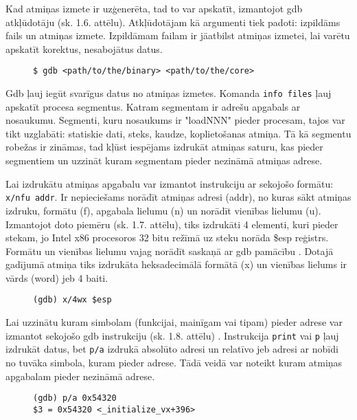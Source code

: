 Kad atmiņas izmete ir uzģenerēta, tad to var apskatīt, izmantojot gdb atkļūdotāju (sk. 1.6. attēlu). 
Atkļūdotājam kā argumenti tiek padoti: izpildāms fails un atmiņas izmete. 
Izpildāmam failam ir jāatbilst atmiņas izmetei, lai varētu apskatīt korektus, nesabojātus datus.

\begin{figure}[h]
\begin{lstlisting}[style=customgdb]
$ gdb <path/to/the/binary> <path/to/the/core>
\end{lstlisting}
\caption{\textbf{\fontsize{11}{12}\selectfont {Atmiņas izmetes atvēršana, izmantojot gdb atkļūdotāju}}}
\end{figure}

Gdb ļauj iegūt svarīgus datus no atmiņas izmetes. Komanda \texttt{info files} ļauj apskatīt procesa segmentus. 
Katram segmentam ir adrešu apgabals ar nosaukumu. 
Segmenti, kuru nosaukums ir "loadNNN" pieder procesam, tajos var tikt uzglabāti: statiskie dati, steks, kaudze, koplietošanas atmiņa.
Tā kā segmentu robežas ir zināmas, tad kļūst iespējams izdrukāt atmiņas saturu, kas pieder segmentiem un uzzināt kuram segmentam pieder nezināmā atmiņas adrese.

Lai izdrukātu atmiņas apgabalu var izmantot instrukciju ar sekojošo formātu: \texttt{x/nfu addr}. 
Ir nepieciešams norādīt atmiņas adresi (addr), no kuras sākt atmiņas izdruku, formātu (f), apgabala lielumu (n) un norādīt vienības lielumu (u). 
Izmantojot doto piemēru (sk. 1.7. attēlu), tiks izdrukāti 4 elementi, kuri pieder stekam, jo Intel x86 procesoros 32 bitu režīmā uz steku norāda \$esp reģistrs. 
Formātu un vienības lielumu vajag norādīt saskaņā ar gdb pamācību \cite{gdb}. 
Dotajā gadījumā atmiņa tiks izdrukāta heksadecimālā formātā (x) un vienības lielums ir vārds (word) jeb 4 baiti.
\begin{figure}[h]
\begin{lstlisting}[style=customgdb]
(gdb) x/4wx $esp
\end{lstlisting}
\caption{\textbf{\fontsize{11}{12}\selectfont {Atmiņas apgabala izdrukāšana}}}
\end{figure}

Lai uzzinātu kuram simbolam (funkcijai, mainīgam vai tipam) pieder adrese var izmantot sekojošo gdb instrukciju (sk. 1.8. attēlu) \cite{gdb}.
Instrukcija \texttt{print} vai \texttt{p} ļauj izdrukāt datus, bet \texttt{p/a} izdrukā absolūto adresi un relatīvo jeb adresi ar nobīdi no tuvāka simbola, kuram pieder adrese.
Tādā veidā var noteikt kuram atmiņas apgabalam pieder nezināmā adrese.
\begin{figure}[h]
\begin{lstlisting}[style=customgdb]
(gdb) p/a 0x54320
$3 = 0x54320 <_initialize_vx+396>
\end{lstlisting}
\caption{\textbf{\fontsize{11}{12}\selectfont {Noteikšana, kuram simbolam pieder adrese}}}
\end{figure}

